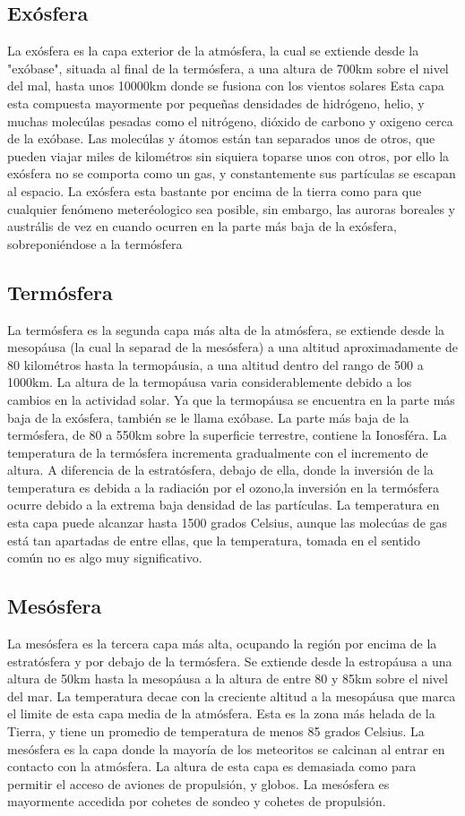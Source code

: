 \documentclass{article}
\begin{document}
\subsection {Exósfera}
La exósfera es la capa exterior de la atmósfera, la cual se extiende desde la "exóbase", situada al final de la termósfera, a una altura de 700km sobre el nivel del mal, hasta unos 10000km donde se fusiona con los vientos solares
Esta capa esta compuesta mayormente por pequeñas densidades de hidrógeno, helio, y muchas molecúlas pesadas como el nitrógeno, dióxido de carbono y oxigeno cerca de la exóbase. Las molecúlas y átomos están tan separados unos de otros, que pueden viajar miles de kilométros sin siquiera toparse unos con otros, por ello la exósfera no se comporta como un gas, y constantemente sus partículas se escapan al espacio.
La exósfera esta bastante por encima de la tierra como para que cualquier fenómeno meteréologico sea posible, sin embargo, las auroras boreales y austrális de vez en cuando ocurren en la parte más baja de la exósfera, sobreponiéndose a la termósfera

\subsection {Termósfera}
La termósfera es la segunda capa más alta de la atmósfera, se extiende desde la mesopáusa (la cual la separad de la mesósfera) a una altitud aproximadamente de 80 kilométros hasta la termopáusia, a una altitud dentro del rango de 500 a 1000km. La altura de la termopáusa varia considerablemente debido a los cambios en la actividad solar. Ya que la termopáusa se encuentra en la parte más baja de la exósfera, también se le llama exóbase.
La parte más baja de la termósfera, de 80 a 550km sobre la superficie terrestre, contiene la Ionosféra.
La temperatura de la termósfera incrementa gradualmente con el incremento de altura. A diferencia de la estratósfera, debajo de ella, donde la inversión de la temperatura es debida a la radiación por el ozono,la inversión en la termósfera ocurre debido a la extrema baja densidad de las partículas. La temperatura en esta capa puede alcanzar hasta 1500 grados Celsius, aunque las molecúas de gas está tan apartadas de entre ellas, que la temperatura, tomada en el sentido común no es algo muy significativo.

\subsection {Mesósfera}
La mesósfera es la tercera capa más alta, ocupando la región por encima de la estratósfera y por debajo de la termósfera. Se extiende desde la estropáusa a una altura de 50km hasta la mesopáusa a la altura de entre 80 y 85km sobre el nivel del mar. La temperatura decae con la creciente altitud a la mesopáusa que marca el limite de esta capa media de la atmósfera. Esta es la zona más helada de la Tierra, y tiene un promedio de temperatura de menos 85 grados Celsius.
La mesósfera es la capa donde la mayoría de los meteoritos se calcinan al entrar en contacto con la atmósfera. La altura de esta capa es demasiada como para permitir el acceso de aviones de propulsión, y globos. La mesósfera es mayormente accedida por cohetes de sondeo y cohetes de propulsión.
\end{document}
